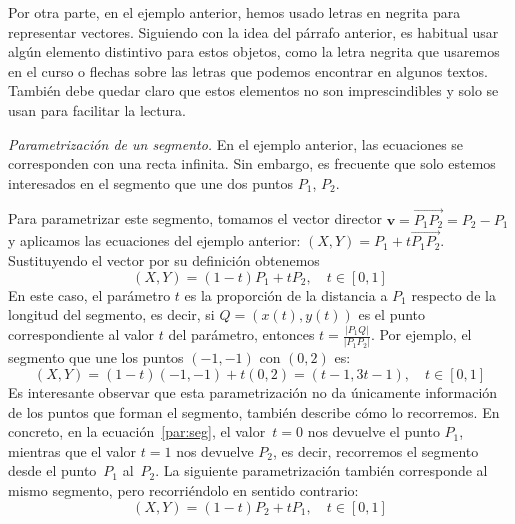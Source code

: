 Por otra parte, en el ejemplo anterior, hemos usado letras en negrita para representar vectores. Siguiendo con la idea del párrafo anterior, es habitual usar algún elemento distintivo para estos objetos, como la letra negrita que usaremos en el curso o flechas sobre las letras que podemos encontrar en algunos textos.
También debe quedar claro que estos elementos no son imprescindibles y solo se usan para facilitar la lectura.
%
\begin{ejemplo}
\emph{Parametrización de un segmento.}
En el ejemplo anterior, las ecuaciones se corresponden con una recta infinita.
Sin embargo, es frecuente que solo estemos interesados en el segmento que une dos puntos $P_1$, $P_2$.
\begin{center}
\end{center}

Para parametrizar este segmento, tomamos el vector director $\boldsymbol{v}=\overrightarrow{P_1P_2}=P_2-P_1$ y aplicamos las ecuaciones del ejemplo anterior: $(X,Y)=P_1+t\overrightarrow{P_1P_2}$.
Sustituyendo el vector por su definición obtenemos
\begin{equation}\label{par:seg}
(X,Y)= (1-t)P_1 + tP_2,\quad t\in [0,1]
\end{equation}
En este caso, el parámetro $t$ es la proporción de la distancia a $P_1$ respecto de la longitud del segmento, es decir, si $Q=(x(t),y(t))$ es el punto correspondiente al valor $t$ del parámetro, entonces $t=\frac{|P_1Q|}{|P_1P_2|}$.
Por ejemplo, el segmento que une los puntos $(-1,-1)$ con $(0,2)$ es:
\[
(X,Y) = (1-t)(-1,-1)+t(0,2)=(t-1,3t-1),\quad t\in[0,1]
\]
Es interesante observar que esta parametrización no da únicamente información de los puntos que forman el segmento, también describe cómo lo recorremos.
En concreto, en la ecuación~\eqref{par:seg}, el valor~$t=0$ nos devuelve el punto $P_1$, mientras que el valor $t=1$ nos devuelve $P_2$, es decir, recorremos el segmento desde el punto~$P_1$ al~$P_2$.
La siguiente parametrización también corresponde al mismo segmento, pero recorriéndolo en sentido contrario:
%
\begin{equation}
(X,Y)= (1-t)P_2 + tP_1 ,\quad t\in [0,1]\tag*{\fej}
\end{equation}
%
\end{ejemplo}
